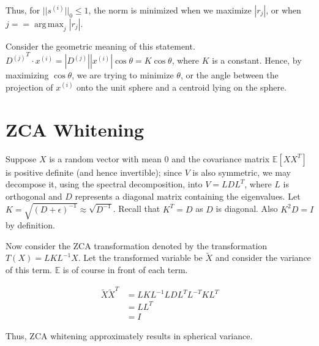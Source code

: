 \documentclass[twoside]{article}
\theoremstyle{definition}
\DeclareMathOperator*{\argmax}{arg\,max}
\theoremstyle{definition}
\theoremstyle{remark}
\def\E{{\mathbb E}}
\begin{document}
Thus, for $||s^{(i)}||_0 \leq 1$, the norm is minimized when we maximize $|r_j|$, or
when $j == \argmax_j |r_j|$.

Consider the geometric meaning of this statement. ${D^{(j)}}^T \cdot x^{(i)} = |D^{(j)}||x^{(i)}| \cos \theta = K \cos \theta$, where $K$ is a constant. Hence, 
by maximizing $\cos \theta$, we are trying to minimize $\theta$, or the angle between the projection of $x^{(i)}$ onto the unit sphere and a centroid lying
on the sphere.

\section{ZCA Whitening}

Suppose $X$ is a random vector with mean 0 and the covariance matrix $\E[X X^T]$ is positive definite (and hence invertible); since
$V$ is also symmetric, we may decompose it, using the spectral decomposition, into $V = LDL^T$, where $L$ is orthogonal and $D$ 
represents a diagonal matrix containing the eigenvalues. Let $K = \sqrt{{(D + \epsilon)}^{-1}} \approx \sqrt{D^{-1}}$.
Recall that $K^T = D$ as $D$ is diagonal. Also $K^2 D = I$ by definition. 

Now consider the ZCA transformation denoted by the transformation $T(X) = LKL^{-1}X$. Let the transformed variable be $\tilde{X}$ and consider the variance of this term. 
$\E$ is of course in front of each term.

\begin{align*}
\tilde{X}\tilde{X}^T &= LKL^{-1}LDL^TL^{-T}KL^T\\
 &= LL^T\\
 &= I
\end{align*}

Thus, ZCA whitening approximately results in spherical variance.
\end{document}
